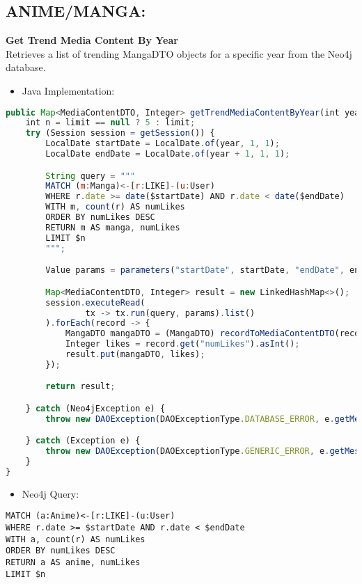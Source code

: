 \subsection*{ANIME/MANGA:}
\textbf{Get Trend Media Content By Year}\\
Retrieves a list of trending MangaDTO objects for a specific year from the Neo4j database.
\begin{itemize}
    \item Java Implementation:
\end{itemize}
\begin{lstlisting}[language=JavaScript]
public Map<MediaContentDTO, Integer> getTrendMediaContentByYear(int year, Integer limit) throws DAOException {
    int n = limit == null ? 5 : limit;
    try (Session session = getSession()) {
        LocalDate startDate = LocalDate.of(year, 1, 1);
        LocalDate endDate = LocalDate.of(year + 1, 1, 1);

        String query = """
        MATCH (m:Manga)<-[r:LIKE]-(u:User)
        WHERE r.date >= date($startDate) AND r.date < date($endDate)
        WITH m, count(r) AS numLikes
        ORDER BY numLikes DESC
        RETURN m AS manga, numLikes
        LIMIT $n
        """;

        Value params = parameters("startDate", startDate, "endDate", endDate, "n", n);

        Map<MediaContentDTO, Integer> result = new LinkedHashMap<>();
        session.executeRead(
                tx -> tx.run(query, params).list()
        ).forEach(record -> {
            MangaDTO mangaDTO = (MangaDTO) recordToMediaContentDTO(record);
            Integer likes = record.get("numLikes").asInt();
            result.put(mangaDTO, likes);
        });

        return result;

    } catch (Neo4jException e) {
        throw new DAOException(DAOExceptionType.DATABASE_ERROR, e.getMessage());

    } catch (Exception e) {
        throw new DAOException(DAOExceptionType.GENERIC_ERROR, e.getMessage());
    }
}
\end{lstlisting}
\begin{itemize}
    \item Neo4j Query:
\end{itemize}
\begin{lstlisting}[language=Cypher]
MATCH (a:Anime)<-[r:LIKE]-(u:User)
WHERE r.date >= $startDate AND r.date < $endDate
WITH a, count(r) AS numLikes
ORDER BY numLikes DESC
RETURN a AS anime, numLikes
LIMIT $n
\end{lstlisting}
